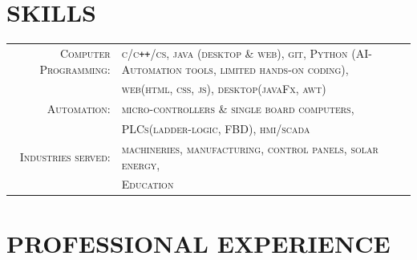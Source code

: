 \documentclass[a4paper]{article}
\begin{document}
\vspace{-0.7em} %
\section{\hfill \textbf{SKILLS}}
	\begin{tabular}{rl}	\small{}
	 	\small{}\textsc{		Computer Programming:	}	& \textsc{					\small{c/c\texttt{++}/cs}, java (desktop \& web), git, Python (AI-Automation tools, limited hands-on coding),			}	\\
  												& \textsc{					web(html, css, js), desktop(javaFx, awt)							} 	\\
 		\small{}\textsc{		Automation:			}	& \textsc{					micro-controllers \& single board computers,						}	\\
  												& \textsc{					PLCs(ladder-logic, FBD), hmi/scada								} 	\\
 		\small{}\textsc{		Industries served:		}	& \textsc{					machineries, manufacturing, control panels, solar energy,				}	\\
  												& \textsc{					Education													} 	\\
	\end{tabular}

\vspace{-0.7em} %
\section{\hfill \textbf{PROFESSIONAL EXPERIENCE}}

\newcommand{\mysymbol}{%
  \mathbin{%
    \begin{tikzpicture}[baseline=-0.5ex, scale=0.12]
      \draw (0,0) -- (0,2);
      \draw (0,2) -- (2,2);
      \draw (2,2) -- (2,0);
      \draw (2,0) -- (0,0);
      \draw (0,1) -- (1,2);
      \draw (1,2) -- (2,1);
      \draw (2,1) -- (1,0);
      \draw (1,0) -- (0,1);
      \draw (0,0) -- (2,2);
      \draw (2,0) -- (0,2);
    \end{tikzpicture}%
  }%
}
\end{document}
